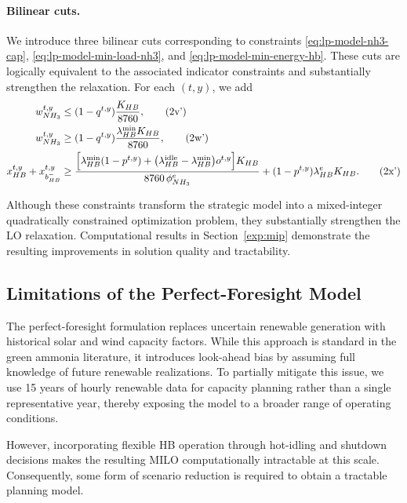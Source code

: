 \documentclass[11pt, letter]{article}
\begin{document}
\paragraph{Bilinear cuts.}
We introduce three bilinear cuts corresponding to constraints \eqref{eq:lp-model-nh3-cap}, \eqref{eq:lp-model-min-load-nh3}, and \eqref{eq:lp-model-min-energy-hb}. These cuts are logically equivalent to the associated indicator constraints and substantially strengthen the relaxation. For each $(t,y)$, we add
\begin{subequations}
\begin{align}
w_{NH_3}^{t,y}
&\le
(1-q^{t,y})
\frac{K_{HB}}{8760},
\tag{2v'}
\\
w_{NH_3}^{t,y}
&\ge
(1-q^{t,y})
\frac{\lambda_{HB}^{\min}K_{HB}}{8760},
\tag{2w'}
\\
x_{HB}^{t,y}
+
x_{b^-_{HB}}^{t,y}
&\ge
\frac{
\Bigl[
\lambda_{HB}^{\min}(1-p^{t,y})
+
\bigl(\lambda_{HB}^{\mathrm{idle}}-\lambda_{HB}^{\min}\bigr)
o^{t,y}
\Bigr]
K_{HB}
}{
8760\,\phi_{NH_3}^{e}
}
+
(1-p^{t,y})
\lambda_{HB}^{e}K_{HB}.
\tag{2x'}
\end{align}
\end{subequations}

Although these constraints transform the strategic model into a mixed-integer quadratically constrained optimization problem, they substantially strengthen the LO relaxation. Computational results in Section~\ref{exp:mip} demonstrate the resulting improvements in solution quality and tractability.
 \subsection{Limitations of the Perfect-Foresight Model}

The perfect-foresight formulation replaces uncertain renewable generation with historical solar and wind capacity factors. While this approach is standard in the green ammonia literature, it introduces look-ahead bias by assuming full knowledge of future renewable realizations. To partially mitigate this issue, we use 15 years of hourly renewable data for capacity planning rather than a single representative year, thereby exposing the model to a broader range of operating conditions.

However, incorporating flexible HB operation through hot-idling and shutdown decisions makes the resulting MILO computationally intractable at this scale. Consequently, some form of scenario reduction is required to obtain a tractable planning model.
\end{document}
